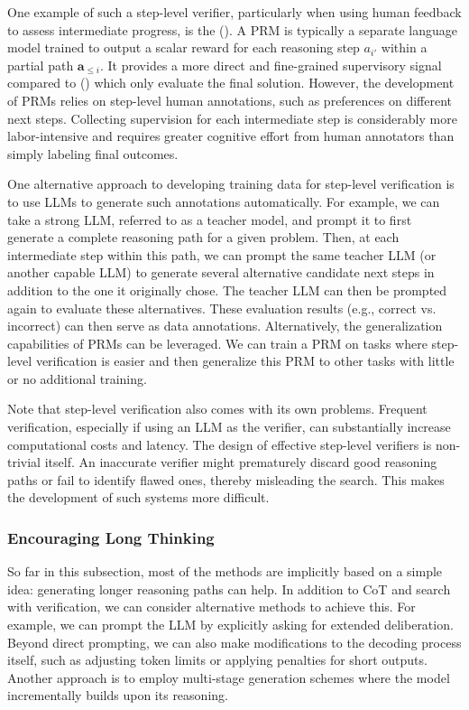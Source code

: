One example of such a step-level verifier, particularly when using human feedback to assess intermediate progress, is the  ().  A PRM is typically a separate language model trained to output a scalar reward for each reasoning step $a_{i'}$ within a partial path $\mathbf{a}_{\le i}$. It provides a more direct and fine-grained supervisory signal compared to  () which only evaluate the final solution. However, the development of PRMs relies on step-level human annotations, such as preferences on different next steps. Collecting supervision for each intermediate step is considerably more labor-intensive and requires greater cognitive effort from human annotators than simply labeling final outcomes.

One alternative approach to developing training data for step-level verification is to use LLMs to generate such annotations automatically. For example, we can take a strong LLM, referred to as a teacher model, and prompt it to first generate a complete reasoning path for a given problem. Then, at each intermediate step within this path, we can prompt the same teacher LLM (or another capable LLM) to generate several alternative candidate next steps in addition to the one it originally chose. The teacher LLM can then be prompted again to evaluate these alternatives. These evaluation results (e.g., correct vs. incorrect) can then serve as data annotations. Alternatively, the generalization capabilities of PRMs can be leveraged. We can train a PRM on tasks where step-level verification is easier and then generalize this PRM to other tasks with little or no additional training.

Note that step-level verification also comes with its own problems. Frequent verification, especially if using an LLM as the verifier, can substantially increase computational costs and latency. The design of effective step-level verifiers is non-trivial itself. An inaccurate verifier might prematurely discard good reasoning paths or fail to identify flawed ones, thereby misleading the search. This makes the development of such systems more difficult.

\subsubsection{Encouraging Long Thinking}

So far in this subsection, most of the methods are implicitly based on a simple idea: generating longer reasoning paths can help. In addition to CoT and search with verification, we can consider alternative methods to achieve this. For example, we can prompt the LLM by explicitly asking for extended deliberation. Beyond direct prompting, we can also make modifications to the decoding process itself, such as adjusting token limits or applying penalties for short outputs. Another approach is to employ multi-stage generation schemes where the model incrementally builds upon its reasoning.

